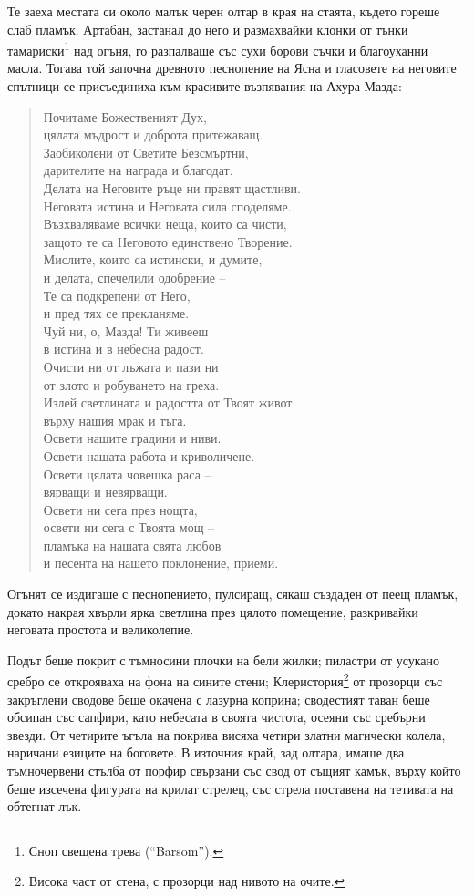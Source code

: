 Те заеха местата си около малък черен олтар в края на стаята, където гореше слаб
пламък. Артабан, застанал до него и размахвайки клонки от тънки
тамариски\footnote{Сноп свещена трева (``Barsom'').} над огъня, го разпалваше
със сухи борови съчки и благоуханни масла. Тогава той започна древното
песнопение на Ясна и гласовете на неговите спътници се присъединиха към
красивите възпявания на Ахура-Мазда:
\begin{quote}
  \begin{obeylines}
    \fontsize{9}{10}\selectfont
    \setlength{\leftskip}{1cm}
    Почитаме Божественият Дух,
    цялата мъдрост и доброта притежаващ.
    Заобиколени от Светите Безсмъртни,
    дарителите на награда и благодат.
    Делата на Неговите ръце ни правят щастливи.
    Неговата истина и Неговата сила споделяме.
    Възхваляваме всички неща, които са чисти,
    защото те са Неговото единствено Творение.
    Мислите, които са истински, и думите,
    и делата, спечелили одобрение --
    Те са подкрепени от Него,
    и пред тях се прекланяме.
    Чуй ни, о, Мазда! Ти живееш
    в истина и в небесна радост.
    Очисти ни от лъжата и пази ни
    от злото и робуването на греха.
    Излей светлината и радостта от Твоят живот
    върху нашия мрак и тъга.
    Освети нашите градини и ниви.
    Освети нашата работа и криволичене.
    Освети цялата човешка раса --
    вярващи и невярващи.
    Освети ни сега през нощта,
    освети ни сега с Твоята мощ --
    пламъка на нашата свята любов
    и песента на нашето поклонение, приеми.
  \end{obeylines}
\end{quote}

Огънят се издигаше с песнопението, пулсиращ, сякаш създаден от пеещ пламък,
докато накрая хвърли ярка светлина през цялото помещение, разкривайки неговата
простота и великолепие.

Подът беше покрит с тъмносини плочки на бели жилки; пиластри от усукано сребро
се открояваха на фона на сините стени; Клеристория\footnote{Висока част от
стена, с прозорци над нивото на очите.} от прозорци със закръглени сводове беше
окачена с лазурна коприна; сводестият таван беше обсипан със сапфири, като
небесата в своята чистота, осеяни със сребърни звезди. От четирите ъгъла на
покрива висяха четири златни магически колела, наричани езиците на боговете. В
източния край, зад олтара, имаше два тъмночервени стълба от порфир свързани със
свод от същият камък, върху който беше изсечена фигурата на крилат стрелец, със
стрела поставена на тетивата на обтегнат лък.

